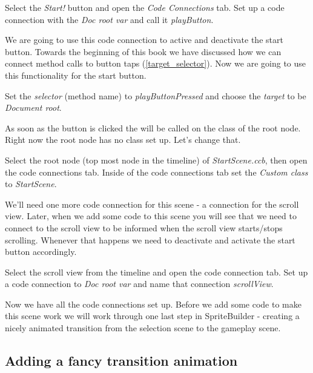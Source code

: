 \begin{leftbar}
Select the \textit{Start!} button and open the \textit{Code Connections}
tab. Set up a code connection with the \textit{Doc root var} and call it
\textit{playButton}. 
\end{leftbar}

We are going to use this code connection to active and deactivate the start
button. Towards the beginning of this book we have discussed how we can connect
method calls to button taps (\ref{target_selector}). Now we are going to use
this functionality for the start button.

\begin{leftbar}
Set the \textit{selector} (method name) to \textit{playButtonPressed} and choose
the \textit{target} to be \textit{Document root}.
\end{leftbar}

As soon as the button is clicked the  will be
called on the class of the root node. Right now the root node has no class set
up. Let's change that.

\begin{leftbar}
Select the root node (top most node in the timeline) of \textit{StartScene.ccb},
then open the code connections tab. Inside of the code connections tab set the
\textit{Custom class} to \textit{StartScene}.
\end{leftbar}

We'll need one more code connection for this scene - a connection for the
scroll view. Later, when we add some code to this scene you will see that we
need to connect to the scroll view to be informed when the scroll view
starts/stops scrolling. Whenever that happens we need to deactivate and activate
the start button accordingly.

\begin{leftbar}
Select the scroll view from the timeline and open the code connection tab. Set
up a code connection to \textit{Doc root var} and name that connection
\textit{scrollView}.
\end{leftbar}

Now we have all the code connections set up. Before we add some code to make
this scene work we will work through one last step in SpriteBuilder - creating a
nicely animated transition from the selection scene to the gameplay scene.

\subsection{Adding a fancy transition animation}

